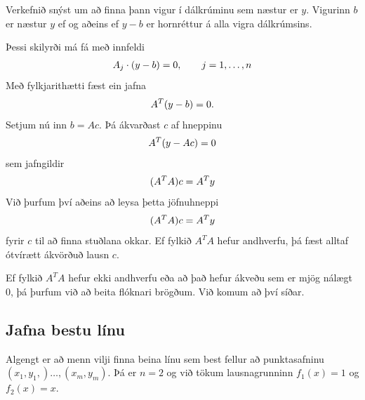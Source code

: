 \documentclass[letterpaper,10pt,icelandic]{sphinxmanual}
\begin{document}
Verkefnið snýst um að finna þann vigur í dálkrúminu sem næstur er
\(y\). Vigurinn \(b\) er næstur \(y\) ef og aðeins ef
\(y-b\) er hornréttur á alla vigra dálkrúmsins.

Þessi skilyrði má fá með innfeldi
\begin{gather}
\begin{split}A_j \cdot (y-b) = 0, \qquad j = 1, \ldots , n\end{split}\notag
\end{gather}
Með fylkjarithætti fæst ein jafna
\begin{gather}
\begin{split}A^T (y-b) = 0.\end{split}\notag
\end{gather}
Setjum nú inn \(b=Ac\). Þá ákvarðast \(c\) af hneppinu
\begin{gather}
\begin{split}A^T(y-Ac) = 0\end{split}\notag
\end{gather}
sem jafngildir
\begin{gather}
\begin{split}(A^TA)c = A^Ty\end{split}\notag
\end{gather}
Við þurfum því aðeins að leysa þetta jöfnuhneppi
\begin{gather}
\begin{split}(A^TA)c = A^Ty\end{split}\notag
\end{gather}
fyrir \(c\) til að finna stuðlana okkar. Ef fylkið \(A^TA\)
hefur andhverfu, þá fæst alltaf ótvírætt ákvörðuð lausn \(c\).

Ef fylkið \(A^TA\) hefur ekki andhverfu eða að það hefur ákveðu sem
er mjög nálægt \(0\), þá þurfum við að beita flóknari brögðum. Við
komum að því síðar.


\subsection{Jafna bestu línu}
\label{kafli03:id11}\label{kafli03:index-25}
Algengt er að menn vilji finna beina línu sem best fellur að
punktasafninu \((x_1,y_1,)\dots,(x_m,y_m)\). Þá er \(n=2\) og
við tökum lausnagrunninn \(f_1(x)=1\) og \(f_2(x)=x\).
\end{document}
